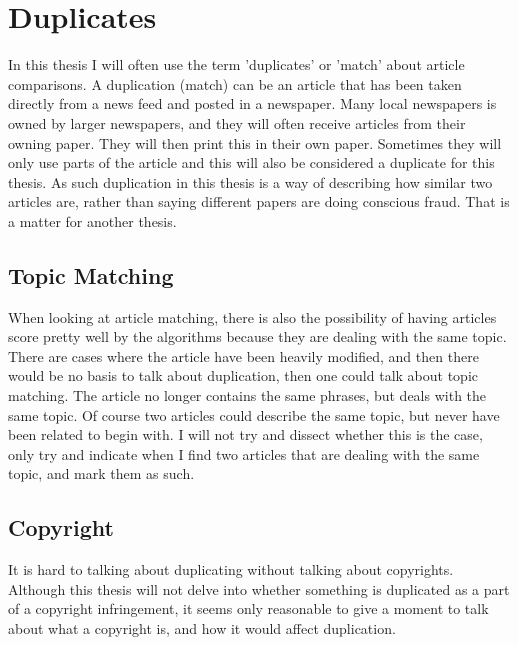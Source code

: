 \section{Duplicates}
In this thesis I will often use the term 'duplicates' or 'match' about article comparisons. A duplication (match) can be an article that has been taken directly from a news feed and posted in a newspaper. Many local newspapers is owned by larger newspapers, and they will often receive articles from their owning paper. They will then print this in their own paper. Sometimes they will only use parts of the article and this will also be considered a duplicate for this thesis. As such duplication in this thesis is a way of describing how similar two articles are, rather than saying different papers are doing conscious fraud. That is a matter for another thesis.

\subsection{Topic Matching}
When looking at article matching, there is also the possibility of having articles score pretty well by the algorithms because they are dealing with the same topic. There are cases where the article have been heavily modified, and then there would be no basis to talk about duplication, then one could talk about topic matching. The article no longer contains the same phrases, but deals with the same topic.
Of course two articles could describe the same topic, but never have been related to begin with. I will not try and dissect whether this is the case, only try and indicate when I find two articles that are dealing with the same topic, and mark them as such. 

\subsection{Copyright}
It is hard to talking about duplicating without talking about copyrights. Although this thesis will not delve into whether something is duplicated as a part of a copyright infringement, it seems only reasonable to give a moment to talk about what a copyright is, and how it would affect duplication.

